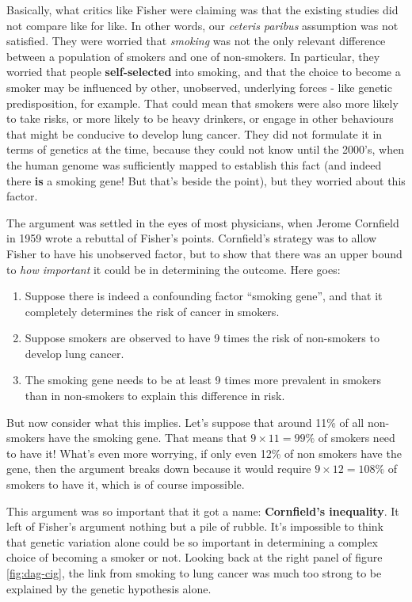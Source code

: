 \documentclass[]{book}
\providecommand{\tightlist}{%
  \setlength{\itemsep}{0pt}\setlength{\parskip}{0pt}}
\begin{document}
Basically, what critics like Fisher were claiming was that the existing studies did not compare like for like. In other words, our \emph{ceteris paribus} assumption was not satisfied. They were worried that \emph{smoking} was not the only relevant difference between a population of smokers and one of non-smokers. In particular, they worried that people \textbf{self-selected} into smoking, and that the choice to become a smoker may be influenced by other, unobserved, underlying forces - like genetic predisposition, for example. That could mean that smokers were also more likely to take risks, or more likely to be heavy drinkers, or engage in other behaviours that might be conducive to develop lung cancer. They did not formulate it in terms of genetics at the time, because they could not know until the 2000's, when the human genome was sufficiently mapped to establish this fact (and indeed there \textbf{is} a smoking gene! But that's beside the point), but they worried about this factor.

The argument was settled in the eyes of most physicians, when Jerome Cornfield in 1959 wrote a rebuttal of Fisher's points. Cornfield's strategy was to allow Fisher to have his unobserved factor, but to show that there was an upper bound to \emph{how important} it could be in determining the outcome. Here goes:

\begin{enumerate}
\def\labelenumi{\arabic{enumi}.}
\tightlist
\item
  Suppose there is indeed a confounding factor ``smoking gene'', and that it completely determines the risk of cancer in smokers.
\item
  Suppose smokers are observed to have 9 times the risk of non-smokers to develop lung cancer.
\item
  The smoking gene needs to be at least 9 times more prevalent in smokers than in non-smokers to explain this difference in risk.
\end{enumerate}

But now consider what this implies. Let's suppose that around 11\% of all non-smokers have the smoking gene. That means that \(9\times 11 = 99\%\) of smokers need to have it! What's even more worrying, if only even 12\% of non smokers have the gene, then the argument breaks down because it would require \(9\times 12 = 108\%\) of smokers to have it, which is of course impossible.

This argument was so important that it got a name: \textbf{Cornfield's inequality}. It left of Fisher's argument nothing but a pile of rubble. It's impossible to think that genetic variation alone could be so important in determining a complex choice of becoming a smoker or not. Looking back at the right panel of figure \ref{fig:dag-cig}, the link from smoking to lung cancer was much too strong to be explained by the genetic hypothesis alone.
\end{document}

